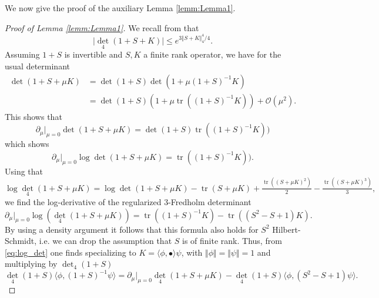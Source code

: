 \documentclass[reqno,12pt,letterpaper]{amsart}
\numberwithin{equation}{section}
\DeclareMathOperator{\tr}{tr}
\begin{document}
 
 We now give the proof of the auxiliary Lemma \ref{lemm:Lemma1}.
 \begin{proof}[Proof of Lemma \ref{lemm:Lemma1}]
 We recall from \cite[Theo.$6.4$]{Simon} that
 \begin{equation}
 \label{eq:useful_bound}
 \vert \det_4(1+S+K) \vert \le e^{ 3 \Vert S+K \Vert_4^4/4}.
 \end{equation}
Assuming $1+S$ is invertible and $S,K$ a finite rank operator, we have for the usual determinant
 \[\begin{split}
  \det(1+S+\mu K) &= \det(1+S) \det(1+\mu (1+S)^{-1} K) \\
  &= \det(1+S) (1+ \mu \tr( (1+S)^{-1} K)) + \mathcal O(\mu^2).
  \end{split}\]
This shows that 
  \[\partial_{\mu} \vert_{\mu=0}\det(1+S+\mu K)  =\det(1+S)  \tr( (1+S)^{-1} K)) \]
which shows 
   \[\partial_{\mu} \vert_{\mu=0} \log\det(1+S+\mu K) =  \tr( (1+S)^{-1} K)).\]
  Using that 
\begin{equation}
\label{eq:log_det}
 \log \det_4(1+S+\mu K) = \log \det(1+S+\mu K) - \tr(S+\mu K) + \tfrac{\tr((S+\mu K)^2)}{2}- \tfrac{\tr((S+\mu K)^3)}{3} ,
 \end{equation}
we find the log-derivative of the regularized 3-Fredholm determinant 
\[ \partial_{\mu} \vert_{\mu=0}  \log( \det_4(1+S+\mu K) ) = \tr((1+S)^{-1} K) - \tr((S^2-S+1)K).\]
By using a density argument it follows that this formula also holds for $S^2$ Hilbert-Schmidt, i.e. we can drop the assumption that $S$ is of finite rank.
Thus, from \eqref{eq:log_det} one finds specializing to $K=\langle \phi, \bullet \rangle \psi$, with $\Vert \phi \Vert = \Vert \psi \Vert =1$ and multiplying by $\det_4(1+S)$
\[ 
\det_4(1+S) \langle \phi, (1+S)^{-1} \psi \rangle = \partial_{\mu} \Big \vert_{\mu=0}\det_4(1+S+\mu K) - \det_4(1+S) \langle \phi,(S^2-S+1)\psi \rangle.
\]


\end{proof}
\end{document}
